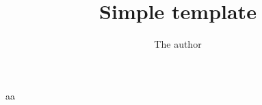 \documentclass{jsarticle}
\title{Simple template}
\author{The author}
\begin{document}
\maketitle
aa
\end{document}
